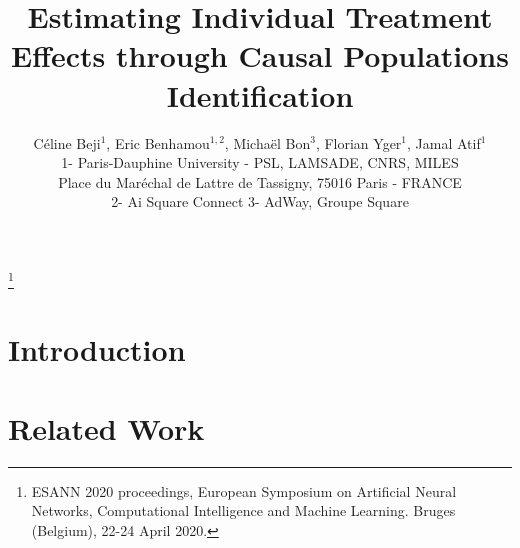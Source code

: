 \documentclass{esann}
\begin{document}

\title{Estimating Individual Treatment Effects through Causal Populations Identification}

\author{C\'eline Beji$^1$, Eric Benhamou$^{1,2}$, Micha\"el Bon$^3$, Florian Yger$^1$, Jamal Atif$^1$
%
%
\vspace{.3cm}\\
%
1- Paris-Dauphine University - PSL, LAMSADE, CNRS, MILES \\
Place du Mar\'echal de Lattre de Tassigny, 75016 Paris - FRANCE
%
\vspace{.05cm}\\
2- Ai Square Connect \hspace{3cm}
3- AdWay, Groupe Square\\
}

\maketitle
\footnote{ESANN 2020 proceedings, European Symposium on Artificial Neural Networks, Computational Intelligence
and Machine Learning. Bruges (Belgium), 22-24 April 2020.}

\begin{abstract}

\end{abstract}


\section{Introduction}


\section{Related Work}

\end{document}
